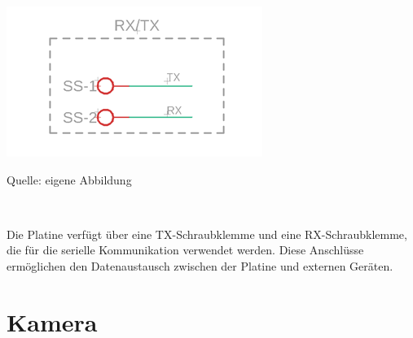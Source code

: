 \documentclass[ngerman,12pt,a4paper]{article}
\begin{document}
	\begin{center} 
		\begin{minipage}[t]{0.45\textwidth}
			\includegraphics{Pictures/RXTX}
			\label{fig:RXTX}
			\vspace{-10pt}
			\begin{center}
				\par\small Quelle: eigene Abbildung
			\end{center}
		\end{minipage} \\[0.75cm]
	\end{center}
	Die Platine verfügt über eine TX-Schraubklemme und eine RX-Schraubklemme, die für die serielle Kommunikation verwendet werden. Diese Anschlüsse ermöglichen den Datenaustausch zwischen der Platine und externen Geräten.
	
	
	\newpage
	\section{Kamera}
	
\end{document}
